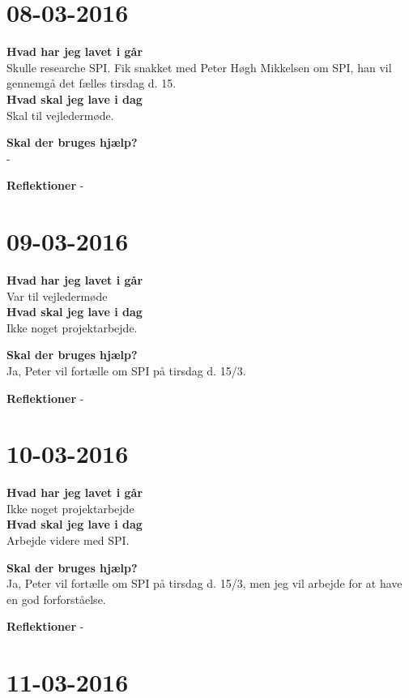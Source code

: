 \documentclass{article}
\begin{document}
	\section{08-03-2016}
	
	\textbf{Hvad har jeg lavet i går}\\
	Skulle researche SPI. Fik snakket med Peter Høgh Mikkelsen om SPI, han vil gennemgå det fælles tirsdag d. 15.\\
	
	\textbf{Hvad skal jeg lave i dag}\\
	Skal til vejledermøde.    
	
	\textbf{Skal der bruges hjælp?}\\
	- 
	
	\textbf{Reflektioner}
	-
	
	\section{09-03-2016}
	
	\textbf{Hvad har jeg lavet i går}\\
	Var til vejledermøde\\
	
	\textbf{Hvad skal jeg lave i dag}\\
	Ikke noget projektarbejde.    
	
	\textbf{Skal der bruges hjælp?}\\
	Ja, Peter vil fortælle om SPI på tirsdag d. 15/3.
	
	\textbf{Reflektioner}
	-

	\section{10-03-2016}
	
	\textbf{Hvad har jeg lavet i går}\\
	Ikke noget projektarbejde\\
	
	\textbf{Hvad skal jeg lave i dag}\\
	Arbejde videre med SPI.    
	
	\textbf{Skal der bruges hjælp?}\\
	Ja, Peter vil fortælle om SPI på tirsdag d. 15/3, men jeg vil arbejde for at have en god forforståelse.
	
	\textbf{Reflektioner}
	-
	
	\section{11-03-2016}
	
\end{document}
